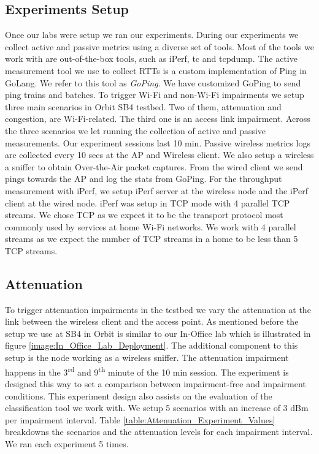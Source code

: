 \subsection{Experiments Setup}\label{Experiments_setup}

Once our labs were setup we ran our experiments. During our experiments we collect active and passive metrics using a diverse set of tools. Most of the tools we work with are out-of-the-box tools, such as iPerf, tc and tcpdump. The active measurement tool we use to collect RTTs is a custom implementation of Ping in GoLang. We refer to this tool as \emph{GoPing}. We have customized GoPing to send ping trains and batches.
To trigger Wi-Fi and non-Wi-Fi impairments we setup three main scenarios in Orbit SB4 testbed. Two of them, attenuation and congestion, are Wi-Fi-related. The third one is an access link impairment. Across the three scenarios we let running the collection of active and passive measurements. Our experiment sessions last 10 min. Passive wireless metrics logs are collected every 10 secs at the AP and Wireless client. We also setup a wireless a sniffer to obtain Over-the-Air packet captures. From the wired client we send pings towards the AP and log the stats from GoPing. For the throughput measurement with iPerf, we setup iPerf server at the wireless node and the iPerf client at the wired node. iPerf was setup in TCP mode with 4 parallel TCP streams. We chose TCP as we expect it to be the transport protocol most commonly used by services at home Wi-Fi networks. We work with 4 parallel streams as we expect the number of TCP streams in a home to be less than 5 TCP streams.

\subsection*{Attenuation}\label{attenuation}

To trigger attenuation impairments in the testbed we vary the attenuation at the link between the wireless client and the access point. As mentioned before the setup we use at SB4 in Orbit is similar to our In-Office lab which is illustrated in figure \ref{image:In_Office_Lab_Deployment}. The additional component to this setup is the node working as a wireless sniffer. The attenuation impairment happens in the 3\textsuperscript{rd} and 9\textsuperscript{th} minute of the 10 min session. The experiment is designed this way to set a comparison between impairment-free and impairment conditions. This experiment design also assists on the evaluation of the classification tool we work with. We setup 5 scenarios with an increase of 3 dBm per impairment interval. Table \ref{table:Attenuation_Experiment_Values} breakdowns the scenarios and the attenuation levels for each impairment interval. We ran each experiment 5 times.

